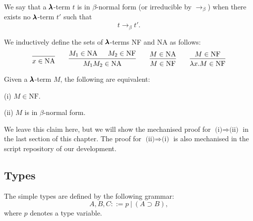
\begin{definition}
  We say that a $\pmb{\lambda}$-term $t$ is in $\beta$-normal form (or irreducible by $\to_\beta$) when there exists no $\pmb{\lambda}$-term $t'$ such that
  \[ t \to_\beta t' . \]
\end{definition}


\begin{definition}%
  \label{beta_nfs}
  We inductively define the sets of $\pmb{\lambda}$-terms NF and NA as follows:
  \[
    \begin{prooftree}
      \infer0{ x \in \text{NA} } 
    \end{prooftree}
    \qquad
    \begin{prooftree}
      \hypo{ M_1 \in \text{NA} }
      \hypo{ M_2 \in \text{NF} }            
      \infer2{ M_1 M_2 \in \text{NA} } 
    \end{prooftree}
    \qquad
    \begin{prooftree}
      \hypo{ M \in \text{NA} }
      \infer1{ M \in \text{NF} } 
    \end{prooftree}
    \qquad
    \begin{prooftree}
      \hypo{ M \in \text{NF} }
      \infer1{ \lambda x . M \in \text{NF} } 
    \end{prooftree}
  \]
\end{definition}


\begin{claim}
  \label{beta_nfs_claim}
  Given a $\pmb{\lambda}$-term $M$, the following are equivalent:

  (i) $M \in \text{NF}$.

  (ii) $M$ is in $\beta$-normal form.
\end{claim}

We leave this claim here, but we will show the mechanised proof for $\boxed{\text{(i)} \Rightarrow \text{(ii)}}$ in the last section of this chapter.
The proof for $\boxed{\text{(ii)} \Rightarrow \text{(i)}}$ is also mechanised in the script repository of our development.


\subsection{Types}

\begin{definition}
  The simple types are defined by the following grammar:  
  \[
    A, B, C ::= p \ | \ (A \supset B),
  \]
  where $p$ denotes a type variable.
\end{definition}

